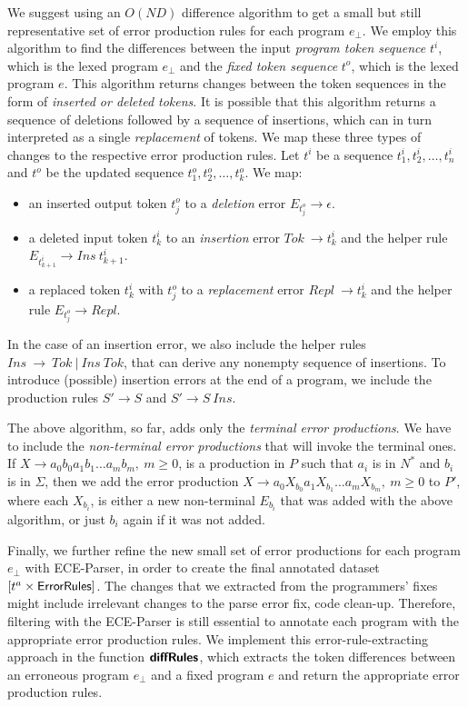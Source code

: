 We suggest using an $O(ND)$ difference algorithm \citep{Myers_1986} to get a
small but still representative set of error production rules for each program
$e_{\bot}$. We employ this algorithm to find the differences between the input
\emph{program token sequence} $t^i$, which is the lexed program $e_{\bot}$ and
the \emph{fixed token sequence} $t^o$, which is the lexed program $e$. This
algorithm returns changes between the token sequences in the form of
\emph{inserted or deleted tokens}. It is possible that this algorithm returns a
sequence of deletions followed by a sequence of insertions, which can in turn
interpreted as a single \emph{replacement} of tokens. We map these three types
of changes to the respective error production rules. Let $t^i$ be a sequence
$t^i_1, t^i_2, \dots, t^i_n$ and $t^o$ be the updated sequence $t^o_1, t^o_2,
\dots, t^o_k$. We map:
\begin{itemize}
    \item an inserted output token $t^o_j$ to a \emph{deletion} error $E_{t^o_j}
    \rightarrow \epsilon$.
    \item a deleted input token $t^i_k$ to an \emph{insertion} error $Tok\
    \rightarrow t^i_k$ and the helper rule $E_{t^i_{k+1}} \rightarrow Ins\
    t^i_{k+1}$.
    \item a replaced token $t^i_k$ with $t^o_j$ to a \emph{replacement} error
    $Repl\ \rightarrow t^i_k$ and the helper rule $E_{t^o_j} \rightarrow Repl$.
\end{itemize}

In the case of an insertion error, we also include the helper rules $Ins\
\rightarrow\ Tok\ \vert\ Ins\ Tok$, that can derive any nonempty sequence of
insertions. To introduce (possible) insertion errors at the end of a program, we
include the production rules $S' \rightarrow S$ and $S' \rightarrow S\ Ins$.

The above algorithm, so far, adds only the \emph{terminal error productions}. We
have to include the \emph{non-terminal error productions} that will invoke the
terminal ones. If $X \rightarrow a_0b_0a_1b_1 \dots a_mb_m,\ m \geq 0$, is a
production in $P$ such that $a_i$ is in $N^*$ and $b_i$ is in $\Sigma$, then we
add the error production $X \rightarrow a_0X_{b_0}a_1X_{b_1} \dots a_mX_{b_m},\
m \geq 0$ to $P'$, where each $X_{b_i}$, is either a new non-terminal $E_{b_i}$
that was added with the above algorithm, or just $b_i$ again if it was not
added.

Finally, we further refine the new small set of error productions for each
program $e_{\bot}$ with ECE-Parser, in order to create the final annotated
dataset $[t^a \times \mathsf{ErrorRules}]$. The changes that we extracted from
the programmers' fixes might include irrelevant changes to the parse error fix,
\eg code clean-up. Therefore, filtering with the ECE-Parser is still essential
to annotate each program with the appropriate error production rules. We
implement this error-rule-extracting approach in the function $\bm{\mathsf{diffRules}}$, which
extracts the token differences between an erroneous program $e_{\bot}$ and a
fixed program $e$ and return the appropriate error production rules.


